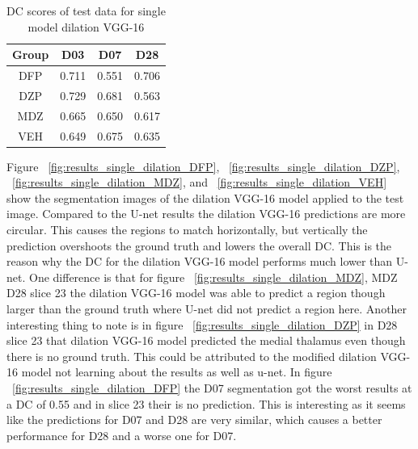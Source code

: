 \begin{table}[tbh]
\renewcommand{\arraystretch}{1}
\centering
\begin{tabular}{|c|c|c|c|}
\hline
\textbf{Group} & \textbf{D03}& \textbf{D07}& \textbf{D28}\\
\hline
DFP & 0.711 & 0.551 & 0.706\\      
\hline
DZP & 0.729 & 0.681 & 0.563\\
\hline
MDZ & 0.665 & 0.650 & 0.617\\ 
\hline
VEH & 0.649 & 0.675 & 0.635\\ 
\hline
\end{tabular}
\caption{DC scores of test data for single model dilation VGG-16}
\label{tab.single_model_results_dilation}
\end{table}


Figure ~\ref{fig:results_single_dilation_DFP}, ~\ref{fig:results_single_dilation_DZP}, ~\ref{fig:results_single_dilation_MDZ}, and ~\ref{fig:results_single_dilation_VEH} show the segmentation images of the dilation VGG-16 model applied to the test image. 
Compared to the U-net results the dilation VGG-16 predictions are more circular. 
This causes the regions to match horizontally, but vertically the prediction overshoots the ground truth and lowers the overall DC.
This is the reason why the DC for the dilation VGG-16 model performs much lower than U-net.
One difference is that for figure ~\ref{fig:results_single_dilation_MDZ}, MDZ D28 slice 23 the dilation VGG-16 model was able to predict a region though larger than the ground truth where U-net did not predict a region here. 
Another interesting thing to note is in figure ~\ref{fig:results_single_dilation_DZP} in D28 slice 23 that dilation VGG-16 model predicted the medial thalamus even though there is no ground truth.
This could be attributed to the modified dilation VGG-16 model not learning about the results as well as u-net.
In figure ~\ref{fig:results_single_dilation_DFP} the D07 segmentation got the worst results at a DC of 0.55 and in slice 23 their is no prediction. 
This is interesting as it seems like the predictions for D07 and D28 are very similar, which causes a better performance for D28 and a worse one for D07.

